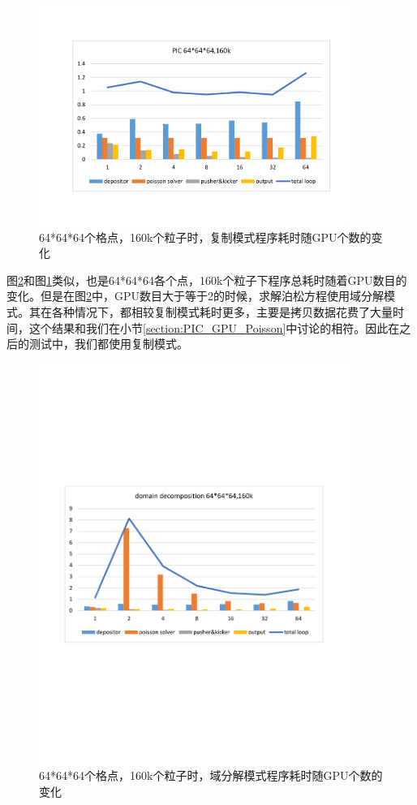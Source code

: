 \begin{figure}[!htb]
  \centering
  \includegraphics[width=0.9\textwidth]{Img/PIC_speedup_Titan_160k_1.pdf}
  \caption{64*64*64个格点，160k个粒子时，复制模式程序耗时随GPU个数的变化}
  \label{fig:PIC_speedup_Titan_160k_1}
\end{figure}

图\ref{fig:PIC_speedup_Titan_160k_2}和图\ref{fig:PIC_speedup_Titan_160k_1}类似，也是64*64*64各个点，160k个粒子下程序总耗时随着GPU数目的变化。但是在图\ref{fig:PIC_speedup_Titan_160k_2}中，GPU数目大于等于2的时候，求解泊松方程使用域分解模式。其在各种情况下，都相较复制模式耗时更多，主要是拷贝数据花费了大量时间，这个结果和我们在小节\ref{section:PIC_GPU_Poisson}中讨论的相符。因此在之后的测试中，我们都使用复制模式。

\begin{figure}[!htb]
  \centering
  \includegraphics[width=0.9\textwidth]{Img/PIC_speedup_Titan_160k_2.pdf}
  \caption{64*64*64个格点，160k个粒子时，域分解模式程序耗时随GPU个数的变化}
  \label{fig:PIC_speedup_Titan_160k_2}
\end{figure}

